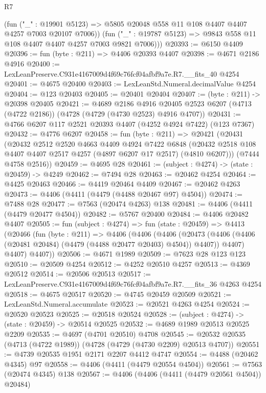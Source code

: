 \begin{lexlean}{R7}
\begin{coremodule}
          (fun ("_" : @19901 @5123) =>
          @5805 @20048 @558 @11 @108 @4407 @4407 @4257 @7003 @20107 @7006))
        (fun ("_" : @19787 @5123) => @9843 @558 @11 @108 @4407 @4407 @4257 @7003 @9821 @7006)))
@20393 := @6150 @4409
@20396 := fun (byte : @211) => @4406 @20393 @4407
@20398 := @4671 @2186 @4916
@20400 := LexLeanPreserve.C931e4167009d4f69c76fcf04afbf9a7e.R7.__fits_40 @4254
@20401 := @4675 @20400
@20403 := LexLeanStd.Numeral.decimalValue @4254
@20404 := @123 @20403
@20405 := @20401 @20404
@20407 := (byte : @211) -> @20398 @20405
@20421 := @4689
    @2186
    @4916
    @20405
    @2523
    @6207
    (@4713 (@4722 @2186))
    (@4728 (@4729 (@4730 @2523) @4916 @4707))
@20431 := @4766 @6207 @117 @2521 @20393 @4407 (@4252 @4924 @7422) (@123 @7367)
@20432 := @4776 @6207
@20458 := fun (byte : @211) =>
  @20421
    (@20431
      (@20432
        @2512
        @2520
        @4663
        @4409
        @4924
        @7422
        @6848
        (@20432 @2518 @108 @4407 @4407 @2517 @4257 (@4897 @6207 @17 @2517) (@4810 @6207)))
      (@7444 @4758 @2516))
@20459 := @4695 @28
@20461 := (subject : @4274) -> (state : @20459) -> @4249
@20462 := @7494 @28
@20463 := @20462 @4254
@20464 := @4425 @20463
@20466 := @4419 @20464 @4409
@20467 := @20462 @4263
@20473 := @4406 (@4411 (@4479 (@4488 @20467 @97) @4504))
@20474 := @7488 @28
@20477 := @7563 (@20474 @4263) @138
@20481 := @4406 (@4411 (@4479 @20477 @4504))
@20482 := @5767 @20400
@20484 := @4406 @20482 @4407
@20505 := fun (subject : @4274) =>
  fun (state : @20459) =>
  @4413
    (@20466
      (fun (byte : @211) =>
      @4406
        (@4406
          (@4406
            (@20473 (@4406 (@4406 (@20481 @20484) (@4479 (@4488 @20477 @20403) @4504)) @4407))
            @4407)
          @4407)
        @4407))
@20506 := @4671 @1989
@20509 := @7623 @28 @123 @123
@20510 := @20509 @4254
@20512 := @4252 @20510 @4257
@20513 := @4369 @20512
@20514 := @20506 @20513
@20517 := LexLeanPreserve.C931e4167009d4f69c76fcf04afbf9a7e.R7.__fits_36 @4263 @4254
@20518 := @4675 @20517
@20520 := @4745 @20459 @20509
@20521 := LexLeanStd.Numeral.accumulate
@20523 := @20521 @4263 @4254
@20524 := @20520 @20523
@20525 := @20518 @20524
@20528 := (subject : @4274) -> (state : @20459) -> @20514 @20525
@20532 := @4689 @1989 @20513 @20525 @2209
@20535 := @4697 (@4701 @20510) @4708
@20545 := @20532 @20535 (@4713 (@4722 @1989)) (@4728 (@4729 (@4730 @2209) @20513 @4707))
@20551 := @4739 @20535 @1951 @2171 @2207 @4412 @4747
@20554 := @4488 (@20462 @4345) @97
@20558 := @4406 (@4411 (@4479 @20554 @4504))
@20561 := @7563 (@20474 @4345) @138
@20567 := @4406 (@4406 (@4411 (@4479 @20561 @4504)) @20484)

\end{coremodule}
\end{lexlean}
